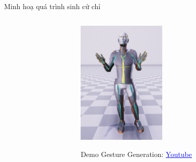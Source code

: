 \documentclass[10pt,mathserif]{beamer}
\begin{document}
\begin{frame}{Minh hoạ quá trình sinh cử chỉ}
\begin{columns}
\begin{column}{0.7\textwidth}
		\end{column}
		\begin{column}{0.3\textwidth} %
			\begin{figure}[h]
			\centering
			\includegraphics[height={6cm}]{SampleAnimation}
			
				
			{
			\small Demo Gesture Generation: \href{https://www.youtube.com/watch?v=B6nv1kQmi-Q}{\textcolor{blue}{\uline{Youtube}}}
			}
			\end{figure}
		\end{column}
	\end{columns}
\end{frame}
\end{document}
